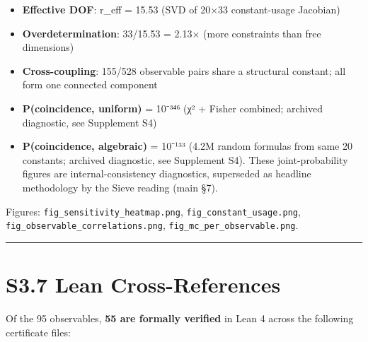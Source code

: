 \documentclass[11pt,a4paper]{article}
\begin{document}
\begin{itemize}
\tightlist
\item
  \textbf{Effective DOF}: r\_\allowbreak{}eff = 15.53 (SVD of 20×33 constant-usage Jacobian)
\item
  \textbf{Overdetermination}: 33/15.53 = 2.13× (more constraints than free dimensions)
\item
  \textbf{Cross-coupling}: 155/528 observable pairs share a structural constant; all form one connected component
\item
  \textbf{P(coincidence, uniform)} = 10⁻³⁴⁶ (χ² + Fisher combined; archived diagnostic, see Supplement S4)
\item
  \textbf{P(coincidence, algebraic)} = 10⁻¹³³ (4.2M random formulas from same 20 constants; archived diagnostic, see Supplement S4). These joint-probability figures are internal-consistency diagnostics, superseded as headline methodology by the Sieve reading (main §7).
\end{itemize}

Figures: \texttt{fig\_\allowbreak{}sensitivity\_\allowbreak{}heatmap.\allowbreak{}png}, \texttt{fig\_\allowbreak{}constant\_\allowbreak{}usage.\allowbreak{}png}, \texttt{fig\_\allowbreak{}observable\_\allowbreak{}correlations.\allowbreak{}png}, \texttt{fig\_\allowbreak{}mc\_\allowbreak{}per\_\allowbreak{}observable.\allowbreak{}png}.

\begin{center}\rule{\linewidth}{0.5pt}\end{center}

\section{S3.7 Lean Cross-References}\label{s3.7-lean-cross-references}

Of the 95 observables, \textbf{55 are formally verified} in Lean 4 across the following certificate files:
\end{document}
